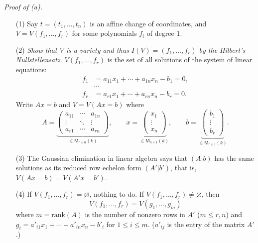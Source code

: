 \documentclass{article}
\begin{document}
\emph{Proof of (a).}
\begin{enumerate}
\item[(1)]
  Say $t = (t_1,\ldots,t_n)$ is an affine change of coordinates,
  and $V = V(f_1,\ldots,f_r)$ for some polynomials $f_i$ of degree $1$.

\item[(2)]
  \emph{Show that $V$ is a variety and thus $I(V) = (f_1, \ldots, f_r)$
  by the Hilbert's Nullstellensatz.}
  $V(f_1, \ldots, f_r)$ is the set of all solutions of the system of linear equations:
  \begin{align*}
    f_1 &= a_{11} x_1 + \cdots + a_{1n} x_n - b_1 = 0, \\
    &\cdots \\
    f_r &= a_{r1} x_1 + \cdots + a_{rn} x_n - b_r = 0.
  \end{align*}
  Write $Ax = b$ and $V = V(Ax = b)$ where
  \[
    A =
    \underbrace{\begin{pmatrix}
    a_{11} & \cdots & a_{1n} \\
    \vdots & \ddots & \vdots \\
    a_{r1} & \cdots & a_{rn}
    \end{pmatrix}}_{\in \mathsf{M}_{r \times n}(k)},
    \qquad
    x =
    \underbrace{\begin{pmatrix}
    x_1 \\
    \vdots \\
    x_{n}
    \end{pmatrix}}_{\in \mathsf{M}_{n \times 1}(k)},
    \qquad
    b =
    \underbrace{\begin{pmatrix}
    b_1 \\
    \vdots \\
    b_{r}
    \end{pmatrix}}_{\in \mathsf{M}_{r \times 1}(k)}.
  \]

\item[(3)]
  The Gaussian elimination in linear algebra says that
  $(A|b)$ has the same solutions as its reduced row echelon form $(A'|b')$,
  that is, $V(Ax = b) = V(A'x = b')$.

\item[(4)]
  If $V(f_1, \ldots, f_r) = \varnothing$, nothing to do.
  If $V(f_1, \ldots, f_r) \neq \varnothing$, then
  \[
    V(f_1, \ldots, f_r) = V(g_1, \ldots, g_m)
  \]
  where $m = \mathrm{rank}(A)$ is the number of nonzero rows in $A'$ ($m \leq r, n$)
  and $g_i = a'_{i1} x_1 + \cdots + a'_{in} x_n - b'_i$ for $1 \leq i \leq m$.
  ($a'_{ij}$ is the entry of the matrix $A'$.)


\end{enumerate}
\end{document}
